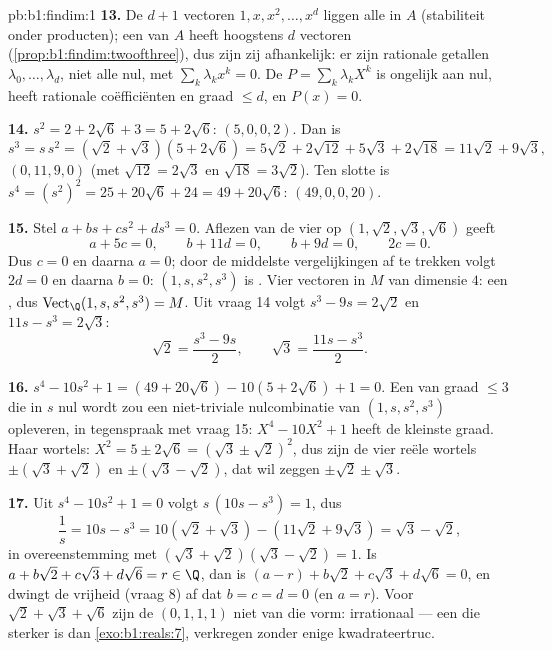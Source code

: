 \begin{solution}{pb:b1:findim:1}
\textbf{13.} De $d + 1$ vectoren $1, x, x^2, \dots, x^{d}$ liggen
alle in $A$ (stabiliteit onder producten); een  van
$A$ heeft hoogstens $d$ vectoren
(\cref{prop:b1:findim:twoofthree}), dus zijn zij afhankelijk: er
zijn rationale getallen $\lambda_0, \dots, \lambda_d$, niet alle
nul, met $\sum_k \lambda_k x^k = 0$. De  $P = \sum_k
\lambda_k X^k$ is ongelijk aan nul, heeft rationale coëfficiënten
en graad $\leq d$, en $P(x) = 0$.

\textbf{14.} $s^2 = 2 + 2\sqrt6 + 3 = 5 + 2\sqrt6$: 
$(5, 0, 0, 2)$. Dan is
\[
s^3 = s\,s^2 = (\sqrt2 + \sqrt3)(5 + 2\sqrt6)
= 5\sqrt2 + 2\sqrt{12} + 5\sqrt3 + 2\sqrt{18}
= 11\sqrt2 + 9\sqrt3 ,
\]
 $(0, 11, 9, 0)$ (met $\sqrt{12} = 2\sqrt3$ en
$\sqrt{18} = 3\sqrt2$). Ten slotte is $s^4 = (s^2)^2 = 25 +
20\sqrt6 + 24 = 49 + 20\sqrt6$:  $(49, 0, 0, 20)$.

\textbf{15.} Stel $a + bs + cs^2 + ds^3 = 0$. Aflezen van de vier
 op $(1, \sqrt2, \sqrt3, \sqrt6)$ geeft
\[
a + 5c = 0,\qquad b + 11d = 0,\qquad b + 9d = 0,\qquad 2c = 0 .
\]
Dus $c = 0$ en daarna $a = 0$; door de middelste vergelijkingen af
te trekken volgt $2d = 0$ en daarna $b = 0$: $(1, s, s^2, s^3)$ is
. Vier  vectoren in $M$ van dimensie $4$: een , dus
$\operatorname{Vect}_\Q(1, s, s^2, s^3) = M$. Uit vraag 14 volgt
$s^3 - 9s = 2\sqrt2$ en $11s - s^3 = 2\sqrt3$:
\[
\sqrt2 = \frac{s^3 - 9s}{2},
\qquad
\sqrt3 = \frac{11s - s^3}{2} .
\]

\textbf{16.} $s^4 - 10s^2 + 1 = (49 + 20\sqrt6) - 10(5 + 2\sqrt6) +
1 = 0$. Een  van graad $\leq 3$ die in $s$ nul
wordt zou een niet-triviale nulcombinatie van $(1, s, s^2, s^3)$
opleveren, in tegenspraak met vraag 15: $X^4 - 10X^2 + 1$ heeft de
kleinste graad. Haar wortels: $X^2 = 5 \pm 2\sqrt6 = (\sqrt3 \pm
\sqrt2)^2$, dus zijn de vier reële wortels $\pm(\sqrt3 + \sqrt2)$
en $\pm(\sqrt3 - \sqrt2)$, dat wil zeggen $\pm\sqrt2 \pm \sqrt3$.

\textbf{17.} Uit $s^4 - 10s^2 + 1 = 0$ volgt $s\,(10s - s^3) = 1$,
dus
\[
\frac1s = 10s - s^3 = 10(\sqrt2 + \sqrt3) - (11\sqrt2 + 9\sqrt3)
= \sqrt3 - \sqrt2 ,
\]
in overeenstemming met $(\sqrt3 + \sqrt2)(\sqrt3 - \sqrt2) = 1$. Is
$a + b\sqrt2 + c\sqrt3 + d\sqrt6 = r \in \Q$, dan is $(a - r) +
b\sqrt2 + c\sqrt3 + d\sqrt6 = 0$, en dwingt de vrijheid (vraag 8)
af dat $b = c = d = 0$ (en $a = r$). Voor $\sqrt2 + \sqrt3 +
\sqrt6$ zijn de  $(0, 1, 1, 1)$ niet van die vorm:
irrationaal --- een  die sterker is dan
\cref{exo:b1:reals:7}, verkregen zonder enige kwadrateertruc.


\end{solution}
